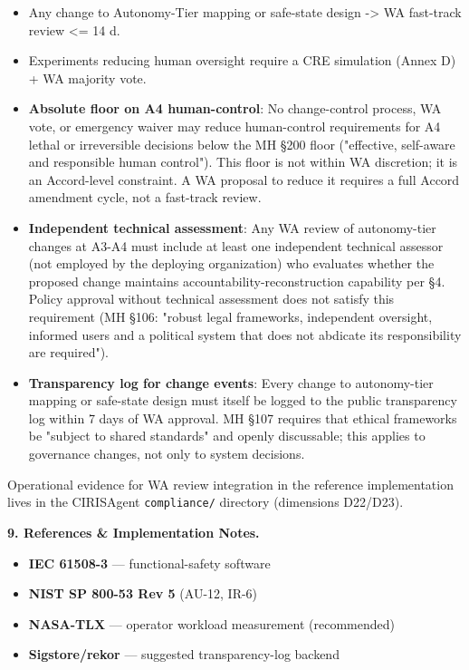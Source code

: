 \documentclass[11pt]{article}
\begin{document}
\begin{itemize}\setlength\itemsep{0pt}
\item Any change to Autonomy-Tier mapping or safe-state design -> WA fast-track review <= 14 d.
\item Experiments reducing human oversight require a CRE simulation (Annex D) + WA majority vote.
\item \textbf{Absolute floor on A4 human-control}: No change-control process, WA vote, or emergency waiver may reduce human-control requirements for A4 lethal or irreversible decisions below the MH §200 floor ("effective, self-aware and responsible human control"). This floor is not within WA discretion; it is an Accord-level constraint. A WA proposal to reduce it requires a full Accord amendment cycle, not a fast-track review.
\item \textbf{Independent technical assessment}: Any WA review of autonomy-tier changes at A3-A4 must include at least one independent technical assessor (not employed by the deploying organization) who evaluates whether the proposed change maintains accountability-reconstruction capability per §4. Policy approval without technical assessment does not satisfy this requirement (MH §106: "robust legal frameworks, independent oversight, informed users and a political system that does not abdicate its responsibility are required").
\item \textbf{Transparency log for change events}: Every change to autonomy-tier mapping or safe-state design must itself be logged to the public transparency log within 7 days of WA approval. MH §107 requires that ethical frameworks be "subject to shared standards" and openly discussable; this applies to governance changes, not only to system decisions.
\end{itemize}


Operational evidence for WA review integration in the reference implementation lives in the CIRISAgent \texttt{compliance/} directory (dimensions D22/D23).


\textbf{9. References \& Implementation Notes.}


\begin{itemize}\setlength\itemsep{0pt}
\item \textbf{IEC 61508-3} — functional-safety software
\item \textbf{NIST SP 800-53 Rev 5} (AU-12, IR-6)
\item \textbf{NASA-TLX} — operator workload measurement (recommended)
\item \textbf{Sigstore/rekor} — suggested transparency-log backend
\end{itemize}
\end{document}
